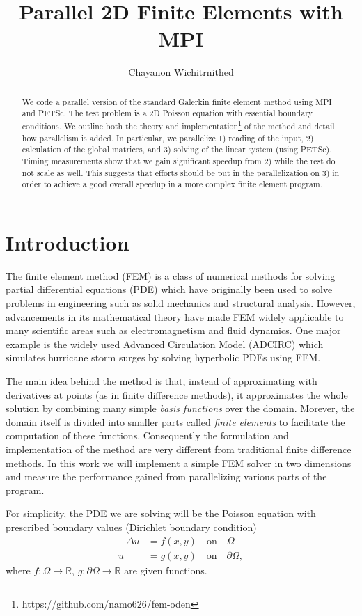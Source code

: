 \documentclass[12pt,notitlepage]{extreport}
\author{Chayanon Wichitrnithed}
\title{Parallel 2D Finite Elements with MPI}
\begin{document}
\maketitle

\begin{abstract}
  We code a parallel version of the standard Galerkin finite element method using MPI and PETSc. The test problem is a 2D Poisson equation with essential boundary conditions. We outline both the theory and implementation\footnote{https://github.com/namo626/fem-oden} of the method and detail how parallelism is added. In particular, we parallelize 1) reading of the input, 2) calculation of the global matrices, and 3) solving of the linear system (using PETSc). Timing measurements show that we gain significant speedup from 2) while the rest do not scale as well. This suggests that efforts should be put in the parallelization on 3) in order to achieve a good overall speedup in a more complex finite element program.
\end{abstract}
\section*{Introduction}
The finite element method (FEM) is a class of numerical methods for solving partial differential equations (PDE) which have originally been used to solve problems in engineering such as solid mechanics and structural analysis. However, advancements in its mathematical theory have made FEM widely applicable to many scientific areas such as electromagnetism and fluid dynamics. One major example is the widely used Advanced Circulation Model (ADCIRC) which simulates hurricane storm surges by solving hyperbolic PDEs using FEM.

The main idea behind the method is that, instead of approximating with derivatives at points (as in finite difference methods), it approximates the whole solution by combining many simple \textit{basis functions} over the domain. Morever, the domain itself is divided into smaller parts called \textit{finite elements} to facilitate the computation of these functions. Consequently the formulation and implementation of the method are very different from traditional finite difference methods. In this work we will implement a simple FEM solver in two dimensions and measure the performance gained from parallelizing various parts of the program.

For simplicity, the PDE we are solving will be the Poisson equation with prescribed boundary values (Dirichlet boundary condition)
\begin{align}
  - \Delta u &= f(x,y) \quad \text{on} \quad \Omega \\
  u &= g(x,y) \quad \text{on} \quad \partial \Omega,
\end{align}
where $f : \Omega \rightarrow \mathbb{R}$, $g: \partial\Omega \rightarrow \mathbb{R}$ are given functions.
\end{document}
